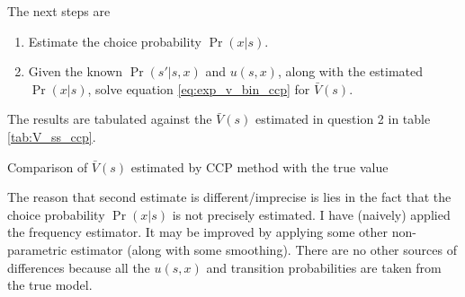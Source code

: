\documentclass[12pt]{article}[margin=1in]
\begin{document}
The next steps are
\begin{enumerate}
    \item Estimate the choice probability ${\Pr}(x|s)$.
    \item Given the known $\Pr(s'|s,x)$ and $u(s,x)$, along with the estimated
          $\Pr(x|s)$, solve equation \ref{eq:exp_v_bin_ccp} for $\bar{V}(s)$.
\end{enumerate}
The results are tabulated against the $\bar{V}(s)$ estimated in question 2 in table \ref{tab:V_ss_ccp}.
\begin{table}
    \centering
    
    \caption{Comparison of $\bar{V}(s)$ estimated by CCP method with the true value}
    \label{tab:V_ss_ccp}
\end{table}
The reason that second estimate is different/imprecise is lies in the fact that the choice probability $\Pr(x|s)$ is not precisely estimated. I have (naively) applied the frequency estimator. It may be improved by applying some other non-parametric estimator (along with some smoothing). There are no other sources of differences because all the $u(s,x)$ and transition probabilities are taken from the true model.
\end{document}
